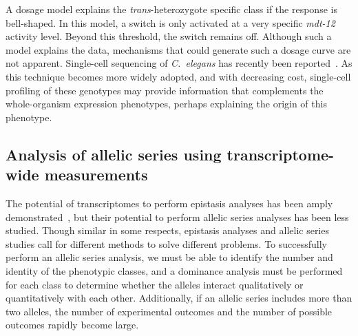 \documentclass[10pt, twocolumn]{article}
\newcommand{\cel}{\emph{C.~elegans}}
\newcommand{\gene}[1]{\mbox{\emph{#1}}}
\newcommand{\dpy}{\gene{mdt-12}}
\begin{document}
A dosage model explains the \emph{trans}-heterozygote specific class if the
response is bell-shaped. In this model, a switch is only activated at a very
specific \dpy{} activity level. Beyond this threshold, the switch remains off.
Although such a model explains the data, mechanisms that could generate such a
dosage curve are not apparent.
Single-cell sequencing of \cel{} has recently been
reported~\cite{Cao2017}. As this technique becomes more widely adopted, and with
decreasing cost, single-cell profiling of these genotypes may provide
information that complements the whole-organism expression phenotypes, perhaps
explaining the origin of this phenotype.

\subsection*{Analysis of allelic series using transcriptome-wide measurements}
The potential of transcriptomes to perform epistasis analyses has been amply
demonstrated~\cite{Dixit2016,Angeles-Albores2017}, but their potential to
perform allelic series analyses has been less studied. Though similar in some
respects, epistasis analyses and allelic series studies call for different
methods to solve different problems. To successfully perform an allelic series
analysis, we must be able to identify the number and identity of the phenotypic
classes, and a dominance analysis must be performed for each class to determine
whether the alleles interact qualitatively or quantitatively with each other.
Additionally, if an allelic series includes more than two alleles, the number of
experimental outcomes and the number of possible outcomes rapidly become large.
\end{document}
